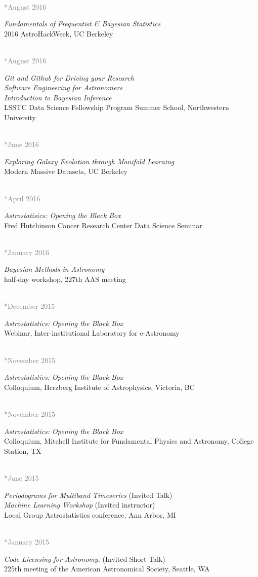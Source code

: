 \documentclass{article} %
\newlength\sidebarwidth
\newcommand{\dateonly}[2][]
	 {\begin{minipage}{\textwidth}
	 \vspace*{.4\baselineskip}
         \nopagebreak\hspace{0in}%
         \nopagebreak\begin{minipage}[t]{\sidebarwidth - .2cm}
         \raggedleft {~}
         {\\[-\baselineskip] \textcolor{gray}{\footnotesize #1}}
	 \end{minipage}%
	 \hfill
	 \begin{minipage}[t]{\linewidth - \sidebarwidth}
	 #2%
	 \end{minipage}%
	 \vspace*{.2\baselineskip plus 1\baselineskip minus
	 .2\baselineskip}%
	 \end{minipage}}
\begin{document}
  \dateonly[**August 2016]{
    {\it Fundamentals of Frequentist \& Bayesian Statistics}\\
    2016 AstroHackWeek, UC Berkeley
  }

  \dateonly[**August 2016]{
      {\it Git and Github for Driving your Research}\\
      {\it Software Engineering for Astronomers}\\
      {\it Introduction to Bayesian Inference}\\
      LSSTC Data Science Fellowship Program Summer School, Northwestern University
  }

  \dateonly[**June 2016]{
      {\it Exploring Galaxy Evolution through Manifold Learning}\\
      Modern Massive Datasets, UC Berkeley
  }

  \dateonly[**April 2016]{
      {\it Astrostatisics: Opening the Black Box}\\
      Fred Hutchinson Cancer Research Center Data Science Seminar
  }

  \dateonly[**January 2016]{
      {\it Bayesian Methods in Astronomy}\\
      half-day workshop, 227th AAS meeting
  }

  \dateonly[**December 2015]{
      {\it Astrostatistics: Opening the Black Box}\\
      Webinar, Inter-institutional Laboratory for e-Astronomy
  }

  \dateonly[**November 2015]{
      {\it Astrostatistics: Opening the Black Box}\\
      Colloquium, Herzberg Institute of Astrophysics, Victoria, BC
  }

  \dateonly[**November 2015]{
      {\it Astrostatistics: Opening the Black Box}\\
      Colloquium, Mitchell Institute for Fundamental Physics and Astronomy, College Station, TX
  }

  \dateonly[**June 2015]{
      {\it Periodograms for Multiband Timeseries} (Invited Talk)\\
      {\it Machine Learning Workshop} (Invited instructor)\\
      Local Group Astrostatistics conference, Ann Arbor, MI
    }

  \dateonly[**January 2015]{
    {\it Code Licensing for Astronomy.} (Invited Short Talk)\\
    225th meeting of the American Astronomical Society, Seattle, WA
  }
\end{document}
